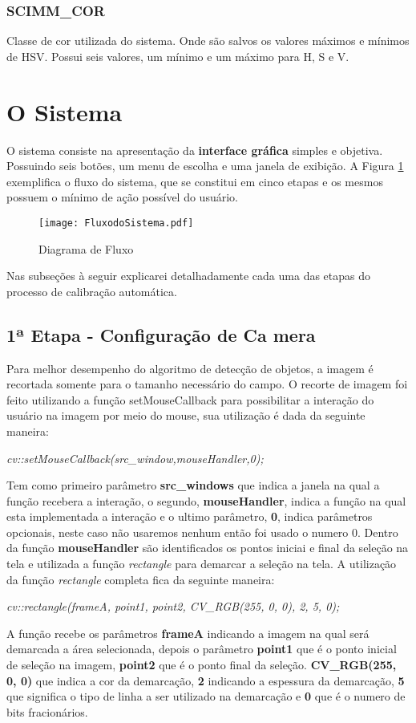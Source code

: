 \subsubsection{SCIMM\_COR}
	Classe de cor utilizada do sistema. Onde são salvos os valores máximos e mínimos de HSV. Possui seis valores, um mínimo e um máximo para H, S e V. 


\section{O Sistema}

		 O sistema consiste na apresentação da \textbf{interface gráfica} simples e objetiva. Possuindo seis botões, um menu de escolha e uma janela de exibição.
		 A Figura \ref{FlowCHart} exemplifica o fluxo do sistema, que se constitui em cinco etapas e os mesmos possuem o mínimo de ação possível do usuário.
		
		\begin{figure}[H]
			\centering
			\texttt{[image: FluxodoSistema.pdf]}
			\caption{Diagrama de Fluxo}
			\label{FlowCHart}
		\end{figure}			
Nas subseções à seguir explicarei detalhadamente cada uma das etapas do processo de calibração automática.
		\subsection{1ª Etapa - Configuração de Ca mera}
		

Para melhor desempenho do algoritmo de detecção de objetos, a imagem é recortada somente para o tamanho necessário do campo. O recorte de imagem foi feito utilizando a função setMouseCallback para possibilitar a interação do usuário na imagem por meio do mouse, sua utilização é dada da seguinte maneira:
\begin{center}
\centering \textit{ cv::setMouseCallback(src\_window,mouseHandler,0);}
\end{center}
Tem como primeiro parâmetro \textbf{src\_windows} que indica a janela na qual a função recebera a interação,  o segundo, \textbf{mouseHandler}, indica a função na qual esta implementada a interação e o ultimo parâmetro, \textbf{0}, indica parâmetros opcionais, neste caso não usaremos nenhum então foi usado o numero 0.
Dentro da função \textbf{mouseHandler} são identificados os pontos iniciai e final da seleção na tela e utilizada a função \textit{rectangle} para demarcar a seleção na tela. A utilização da função \textit{rectangle} completa fica da seguinte maneira:
\begin{center}
\centering \textit{ cv::rectangle(frameA, point1, point2, CV\_RGB(255, 0, 0), 2, 5, 0);}
\end{center}
A função recebe os parâmetros \textbf{frameA} indicando a imagem na qual será demarcada a área selecionada, depois o parâmetro \textbf{point1} que é o ponto inicial de seleção na imagem, \textbf{point2} que é o ponto final da seleção. \textbf{CV\_RGB(255, 0, 0)} que indica a cor da demarcação, \textbf{2} indicando a espessura da demarcação, \textbf{5} que significa o tipo de linha a ser utilizado na demarcação e \textbf{0} que é o numero de bits fracionários.

